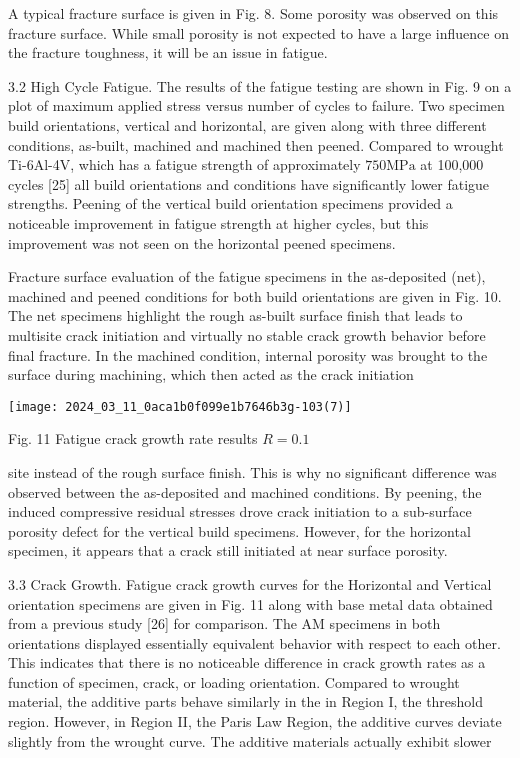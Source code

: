 \documentclass[10pt]{article}
\begin{document}
A typical fracture surface is given in Fig. 8. Some porosity was observed on this fracture surface. While small porosity is not expected to have a large influence on the fracture toughness, it will be an issue in fatigue.

3.2 High Cycle Fatigue. The results of the fatigue testing are shown in Fig. 9 on a plot of maximum applied stress versus number of cycles to failure. Two specimen build orientations, vertical and horizontal, are given along with three different conditions, as-built, machined and machined then peened. Compared to wrought Ti-6Al-4V, which has a fatigue strength of approximately $750 \mathrm{MPa}$ at 100,000 cycles [25] all build orientations and conditions have significantly lower fatigue strengths. Peening of the vertical build orientation specimens provided a noticeable improvement in fatigue strength at higher cycles, but this improvement was not seen on the horizontal peened specimens.

Fracture surface evaluation of the fatigue specimens in the as-deposited (net), machined and peened conditions for both build orientations are given in Fig. 10. The net specimens highlight the rough as-built surface finish that leads to multisite crack initiation and virtually no stable crack growth behavior before final fracture. In the machined condition, internal porosity was brought to the surface during machining, which then acted as the crack initiation

\begin{center}
\texttt{[image: 2024\_03\_11\_0aca1b0f099e1b7646b3g-103(7)]}
\end{center}

Fig. 11 Fatigue crack growth rate results $R=0.1$

site instead of the rough surface finish. This is why no significant difference was observed between the as-deposited and machined conditions. By peening, the induced compressive residual stresses drove crack initiation to a sub-surface porosity defect for the vertical build specimens. However, for the horizontal specimen, it appears that a crack still initiated at near surface porosity.

3.3 Crack Growth. Fatigue crack growth curves for the Horizontal and Vertical orientation specimens are given in Fig. 11 along with base metal data obtained from a previous study [26] for comparison. The AM specimens in both orientations displayed essentially equivalent behavior with respect to each other. This indicates that there is no noticeable difference in crack growth rates as a function of specimen, crack, or loading orientation. Compared to wrought material, the additive parts behave similarly in the in Region I, the threshold region. However, in Region II, the Paris Law Region, the additive curves deviate slightly from the wrought curve. The additive materials actually exhibit slower
\end{document}
